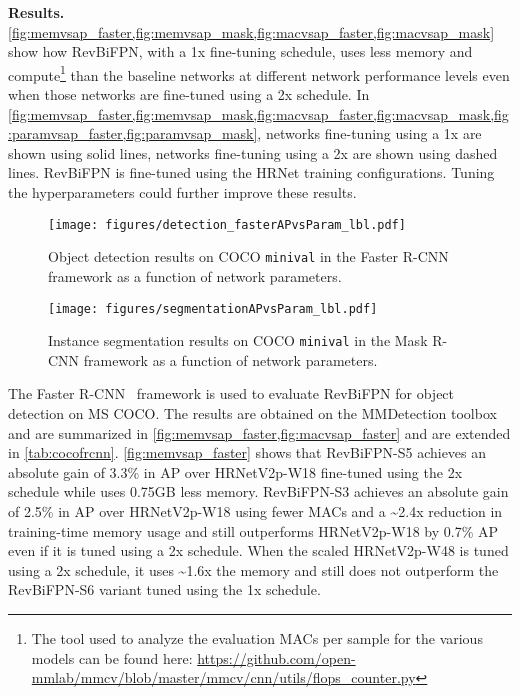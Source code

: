 \documentclass{article}
\begin{document}
\textbf{Results.}
\cref{fig:memvsap_faster,fig:memvsap_mask,fig:macvsap_faster,fig:macvsap_mask} show how RevBiFPN, with a 1x fine-tuning schedule, uses less memory and compute\footnote{The tool used to analyze the evaluation MACs per sample for the various models can be found here: \url{https://github.com/open-mmlab/mmcv/blob/master/mmcv/cnn/utils/flops_counter.py}} than the baseline networks at different network performance levels even when those networks are fine-tuned using a 2x schedule.
In \cref{fig:memvsap_faster,fig:memvsap_mask,fig:macvsap_faster,fig:macvsap_mask,fig:paramvsap_faster,fig:paramvsap_mask}, networks fine-tuning using a 1x are shown using solid lines, networks fine-tuning using a 2x are shown using dashed lines.
RevBiFPN is fine-tuned using the HRNet training configurations.
Tuning the hyperparameters could further improve these results.

\begin{figure*}
    \begin{minipage}{0.48\linewidth}
        \centering
        \texttt{[image: figures/detection\_fasterAPvsParam\_lbl.pdf]}
        \vskip -10pt
        \caption{
            Object detection results on COCO \texttt{minival} in the Faster R-CNN framework as a function of network parameters.
}
        \label{fig:paramvsap_faster}
\end{minipage}
    \hfill
    \begin{minipage}{0.48\linewidth}
        \centering
        \texttt{[image: figures/segmentationAPvsParam\_lbl.pdf]}
        \vskip -10pt
        \caption{
            Instance segmentation results on COCO \texttt{minival} in the Mask R-CNN framework as a function of network parameters.
}
        \label{fig:paramvsap_mask}
\end{minipage}
\end{figure*}

The Faster R-CNN~\cite{he2017mask} framework is used to evaluate RevBiFPN for object detection on MS COCO.
The results are obtained on the MMDetection toolbox and are summarized in \cref{fig:memvsap_faster,fig:macvsap_faster} and are extended in \cref{tab:cocofrcnn}. 
\cref{fig:memvsap_faster} shows that RevBiFPN-S5 achieves an absolute gain of 3.3\% in AP over HRNetV2p-W18 fine-tuned using the 2x schedule while uses 0.75GB less memory.
RevBiFPN-S3 achieves an absolute gain of 2.5\% in AP over HRNetV2p-W18 using fewer MACs and a \textasciitilde2.4x reduction in training-time memory usage and still outperforms HRNetV2p-W18 by 0.7\% AP even if it is tuned using a 2x schedule.
When the scaled HRNetV2p-W48 is tuned using a 2x schedule, it uses \textasciitilde1.6x the memory and still does not outperform the RevBiFPN-S6 variant tuned using the 1x schedule.
\end{document}
